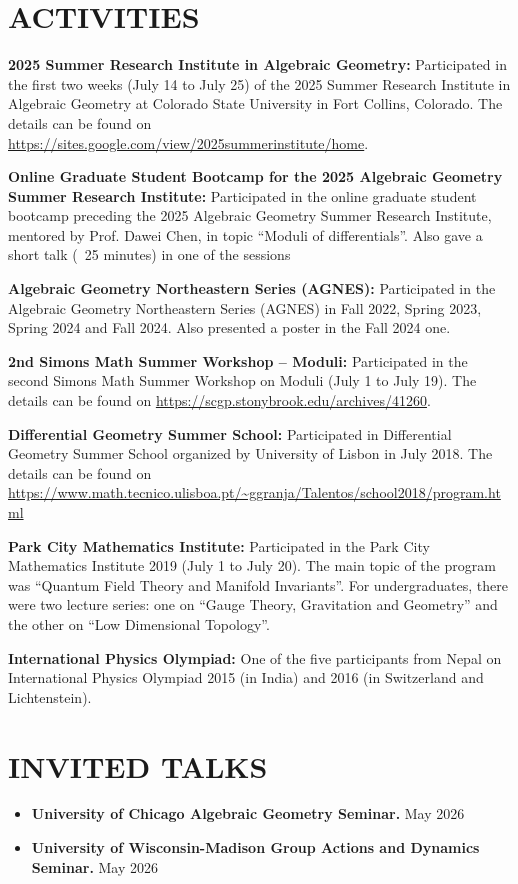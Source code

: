 \documentclass[margin]{res}
\begin{document}
\begin{resume}
\section{ACTIVITIES}
\par
\textbf{2025 Summer Research Institute in Algebraic Geometry:} Participated in the first two weeks (July 14 to July 25) of the 2025 Summer Research Institute in Algebraic Geometry at Colorado State University in Fort Collins, Colorado. The details can be found on \url{https://sites.google.com/view/2025summerinstitute/home}.
\par
\textbf{Online Graduate Student Bootcamp for the 2025 Algebraic Geometry Summer Research Institute:} Participated in the online graduate student bootcamp preceding the 2025 Algebraic Geometry Summer Research Institute, mentored by Prof. Dawei Chen, in topic ``Moduli of differentials''. Also gave a short talk (~25 minutes) in one of the sessions
\par
\textbf{Algebraic Geometry Northeastern Series (AGNES):} Participated in the Algebraic Geometry Northeastern Series (AGNES) in Fall 2022, Spring 2023, Spring 2024 and Fall 2024. Also presented a poster in the Fall 2024 one.
\par
\textbf{2nd Simons Math Summer Workshop -- Moduli:} Participated in the second Simons Math Summer Workshop on Moduli (July 1 to July 19). The details can be found on  \url{https://scgp.stonybrook.edu/archives/41260}.
\par
\textbf{Differential Geometry Summer School:} Participated in Differential Geometry Summer School organized by University of Lisbon in July 2018. The details can be found on  \url{https://www.math.tecnico.ulisboa.pt/~ggranja/Talentos/school2018/program.html}
\par
\textbf{Park City Mathematics Institute:} Participated in the Park City Mathematics Institute 2019 (July 1 to July 20). The main topic of the program was ``Quantum Field Theory and Manifold Invariants''. For undergraduates, there were two lecture series: one on ``Gauge Theory, Gravitation and Geometry'' and the other on ``Low Dimensional Topology''.
\par
\textbf{International Physics Olympiad:} One of the five participants from Nepal on International Physics Olympiad 2015 (in India) and 2016 (in Switzerland and Lichtenstein).

\section{INVITED TALKS}
\begin{itemize}
\item \textbf{University of Chicago Algebraic Geometry Seminar.} May 2026
\item \textbf{University of Wisconsin-Madison Group Actions and Dynamics Seminar.} May 2026
\end{itemize}


\end{resume}
\end{document}
